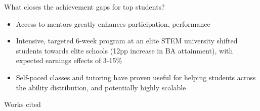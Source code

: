 \documentclass[aspectratio=169, handout, sectionslides]{padajar-slides} %
\begin{document}
\begin{frame}{What closes the achievement gaps for top students?}
	\begin{itemize}
		\item Access to mentors greatly enhances participation, performance 
		\item Intensive, targeted 6-week program at an elite STEM university shifted students towards elite schools (12pp increase in BA attainment), with expected earnings effects of 3-15\% 
		\item Self-paced classes and tutoring have proven useful for helping students across the ability distribution, and potentially highly scalable 
	\end{itemize}
\end{frame}

\renewcommand{\bibsection}{}

\begin{frame}[allowframebreaks]{Works cited}
	\footnotesize
	
	
\end{frame}
\end{document}

